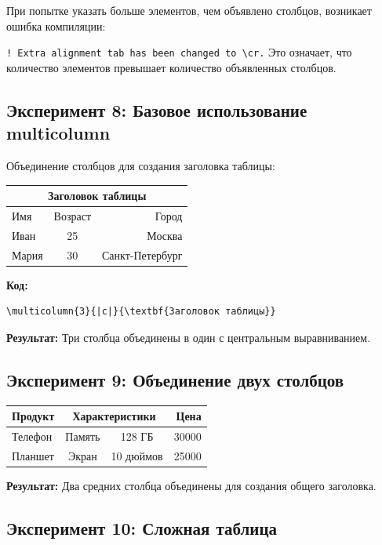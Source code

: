 \documentclass[12pt,a4paper]{article}
\begin{document}
При попытке указать больше элементов, чем объявлено столбцов, возникает ошибка компиляции:

\texttt{! Extra alignment tab has been changed to \textbackslash cr.}
Это означает, что количество элементов превышает количество объявленных столбцов.

\subsection{Эксперимент 8: Базовое использование multicolumn}

Объединение столбцов для создания заголовка таблицы:

\begin{center}
\begin{tabular}{|l|c|r|}
\hline
\multicolumn{3}{|c|}{\textbf{Заголовок таблицы}} \\
\hline
Имя & Возраст & Город \\
\hline
Иван & 25 & Москва \\
Мария & 30 & Санкт-Петербург \\
\hline
\end{tabular}
\end{center}

\textbf{Код:}
\begin{verbatim}
\multicolumn{3}{|c|}{\textbf{Заголовок таблицы}}
\end{verbatim}

\textbf{Результат:} Три столбца объединены в один с центральным выравниванием.

\subsection{Эксперимент 9: Объединение двух столбцов}

\begin{center}
\begin{tabular}{|l|c|c|r|}
\hline
Продукт & \multicolumn{2}{c|}{Характеристики} & Цена \\
\hline
Телефон & Память & 128 ГБ & 30000 \\
Планшет & Экран & 10 дюймов & 25000 \\
\hline
\end{tabular}
\end{center}

\textbf{Результат:} Два средних столбца объединены для создания общего заголовка.

\subsection{Эксперимент 10: Сложная таблица}
\end{document}
